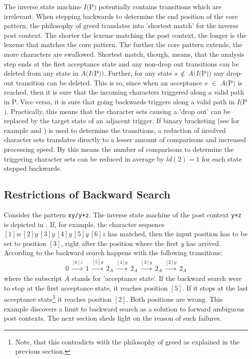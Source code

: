 \documentclass[acmtoplas]{acmtrans2m}
\newcommand{\finv}[1]{$I(${\sf #1}$)$}
\newcommand{\pP}{{\sf P}}
\begin{document}
The inverse state machine \finv{P} potentially contains transitions which are
irrelevant.  When stepping backwards to determine the end position of the core
pattern, the philosophy of greed translates into 'shortest match' for the
inverse post context.  The shorter the lexeme matching the post context, the
longer is the lexeme that matches the core pattern. The further the core
pattern extends, the more characters are swallowed.  Shortest match, though,
        means, that the analysis step ends at the first acceptance state and
        any non-drop out transitions can be deleted from any state in
        $A(I($\pP$))$. Further, for any state $s\,\notin\,A(I($\pP$))$ any
        drop-out transition can be deleted.  This is so, since when an
        acceptance $s$ $\in$ $A($\pP$)$ is reached, then it is sure that the
        incoming characters triggered along a valid path in \pP. Vice versa, it
        is sure that going backwards triggers along a valid path in $I($\pP$)$.
        Practically, this means that the character sets causing a 'drop out'
        can be replaced by the target state of an adjacent trigger.  If binary
        bracketing (see for example \cite{Knuth:1998} and
                    \cite{Press:NumRec:1992}) is used to determine the
        transitions, a reduction of involved character sets translates directly
        to a lesser amount of comparisons and increased processing speed.  By
        this means the number of comparisons to determine the triggering
        character sets can be reduced in average by $ld(2)=1$ for each state
        stepped backwards.

\subsection{Restrictions of Backward Search}

Consider the pattern {\tt xy/y+z}. The inverse state machine of the post
context {\tt y+z} is depicted in .  If, for example, the character sequence 
    $[1]w\,[2]y\,[3]y\,[4]y\,[5]y\,[6]z$ has matched, then the input position has to
be set to position $[3]$, right after the position where the first {\it y} has arrived. 
According to  the backward search happens with the following
transitions:
\begin{eqnarray}
0   \, \stackrel{[6]z}{\longrightarrow} \,
1   \, \stackrel{[5]y}{\longrightarrow} \,
2_A \, \stackrel{[4]y}{\longrightarrow} \,
2_A \, \stackrel{[3]y}{\longrightarrow} \,
2_A \, \stackrel{[2]y}{\longrightarrow} \,
2_A
\end{eqnarray}
where the subscript $A$ stands for 'acceptance state'. If the backward search were to
stop at the first acceptance state, it reaches position $[5]$. If it stops
at the last acceptance state\footnote{Note, that this contradicts with the philosophy of greed as
explained in the previous section.} it reaches position $[2]$. Both positions are wrong.
This example discovers a limit to backward search as a solution to forward ambiguous
post contexts. The next section sheds light on the reason of such failures.
    
\end{document}
